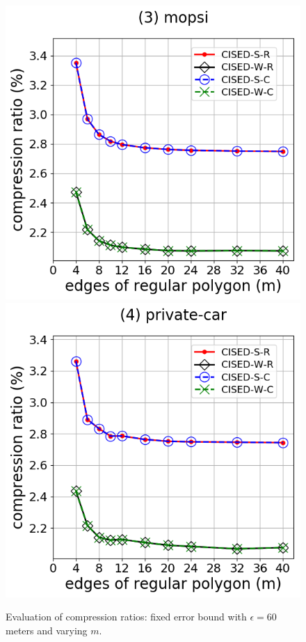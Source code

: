 {\begin{figure}[tb!]
\includegraphics[scale = 0.275]{Figures/Exp-M-e-60-CR-mopsi.png}\hspace{3ex}
\includegraphics[scale = 0.275]{Figures/Exp-M-e-60-CR-private.png}
\caption{\small Evaluation of compression ratios: fixed error bound with $\epsilon=60$ meters and varying $m$.}
\label{fig:m-cr-e60}
\vspace{-1ex}
\end{figure}


}
